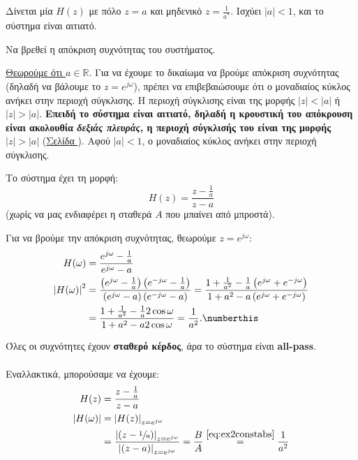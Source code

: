 \documentclass[11pt,a4paper,notitlepage,fleqn]{article}
\begin{document}
\begin{exercise}
	Δίνεται μία \( H(z) \) με πόλο \( z=a \) και μηδενικό \( z=\frac{1}{a^*} \). Ισχύει
	\( |a|<1 \), και το σύστημα είναι αιτιατό.
	
	Να βρεθεί η απόκριση συχνότητας του συστήματος.
	
	\tcblower
	\underline{Θεωρούμε ότι \( a\in\mathbb R \)}. Για να έχουμε το δικαίωμα να βρούμε απόκριση συχνότητας (δηλαδή
	να βάλουμε το \( z=e^{j\omega } \)), πρέπει να επιβεβαιώσουμε ότι ο μοναδιαίος κύκλος ανήκει στην περιοχή σύγκλισης.
	Η περιοχή σύγκλισης είναι της μορφής \( |z|<|a| \) ή \( |z|>|a| \). \textbf{Επειδή το σύστημα είναι αιτιατό, δηλαδή η κρουστική του απόκρουση είναι ακολουθία \emph{δεξιάς πλευράς}, η περιοχή σύγκλισής του είναι της μορφής \( |z| > |a| \)} (\hyperref[sec:sequencez]{Σελίδα \pageref*{sec:sequencez}}). Αφού \( |a|<1 \), ο μοναδιαίος κύκλος ανήκει στην περιοχή σύγκλισης.
	
	Το σύστημα έχει τη μορφή:
	\[
	H(z) = \frac{z-\frac{1}{a}}{z-a}
	\]
	(χωρίς να μας ενδιαφέρει η σταθερά \( Α \) που μπαίνει από μπροστά).
	
	Για να βρούμε την απόκριση συχνότητας, θεωρούμε \( z = e^{j\omega } \):
	\begin{align*}
		H(\omega ) &= \frac{e^{j\omega } - \frac{1}{a}}{e^{j\omega } - a}
		\\
		\left| H(\omega ) \right|^2
		&= \frac{\left(e^{j\omega }-\frac{1}{a}\right)\left(e^{-j\omega }-\frac{1}{a}\right)}{
	\left( e^{j\omega } - a \right)	\left( e^{-j\omega } -a \right)
	} = \frac{1+\frac{1}{a^2}-\frac{1}{a}\left( e^{j\omega }+e^{-j\omega } \right)}{1+a^2-a\left(
	e^{j\omega }+e^{-j\omega }\right)}
        \\ &= \frac{1+\frac{1}{a^2}-\frac{1}{a}2\cos \omega }{1+a^2-a 2\cos\omega} = \frac{1}{a^2}.
        \numberthis\label{eq:ex2constabs}
	\end{align*}
	
	Όλες οι συχνότητες έχουν \textbf{σταθερό κέρδος}, άρα το σύστημα είναι \textbf{all-pass}.
	
	\paragraph{}
	\begin{minipage}{.5\textwidth}
	Εναλλακτικά, μπορούσαμε να έχουμε:
	\begin{align*}
	H(z) &= \frac{z-\frac{1}{a}}{z-a}\\
	\left|H(\omega )\right| &= \left|H(z)\right|_{z=e^{j\omega }}\\
	&= \frac{\left| \left(z-\sfrac{1}{a} \right) \right|_{z=e^{j\omega }}}{
		\left| (z-a) \right|_{z=e^{j\omega }}
	} = \frac{B}{A} \stackrel{\eqref{eq:ex2constabs}}{=} \frac{1}{a^2}
	\end{align*}
	\end{minipage}
\begin{minipage}{.5\textwidth}
	\begin{center}
\end{center}
\end{minipage}
\end{exercise}
\end{document}
